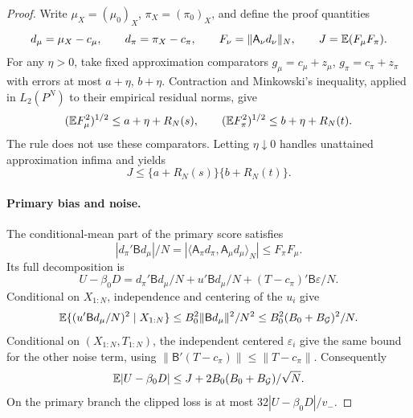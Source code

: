 \begin{proof}
Write $\mu_X=(\mu_0)_X$, $\pi_X=(\pi_0)_X$, and define the proof
quantities
\[
 d_\mu=\mu_X-c_\mu,\qquad d_\pi=\pi_X-c_\pi,\qquad
 F_\nu=\|\mathsf A_\nu d_\nu\|_N,\qquad J=\mathbb E(F_\mu F_\pi).
\]
For any $\eta>0$, take fixed approximation comparators
$g_\mu=c_\mu+z_\mu$, $g_\pi=c_\pi+z_\pi$ with errors at most
$a+\eta$, $b+\eta$. Contraction and Minkowski's inequality, applied in
$L_2(P^N)$ to their empirical residual norms, give
\[
 (\mathbb E F_\mu^2)^{1/2}\le a+\eta+R_N(s),
 \qquad
 (\mathbb E F_\pi^2)^{1/2}\le b+\eta+R_N(t).
\]
The rule does not use these comparators. Letting $\eta\downarrow0$
handles unattained approximation infima and yields
\begin{equation}
 J\le\{a+R_N(s)\}\{b+R_N(t)\}.
 \label{eq:adaptation-affine-moments-bound}
\end{equation}

\paragraph{Primary bias and noise.}
The conditional-mean part of the primary score satisfies
\begin{equation}
 |d_\pi'\mathsf B d_\mu|/N
 =|\langle\mathsf A_\pi d_\pi,\mathsf A_\mu d_\mu\rangle_N|
 \le F_\pi F_\mu.
 \label{eq:adaptation-bias}
\end{equation}
Its full decomposition is
\[
 U-\beta_0D=d_\pi'\mathsf B d_\mu/N
       +u'\mathsf B d_\mu/N
       +(T-c_\pi)'\mathsf B\varepsilon/N.
\]
Conditional on $X_{1:N}$, independence and centering of the $u_i$ give
\[
 \mathbb E\{(u'\mathsf B d_\mu/N)^2\mid X_{1:N}\}
 \le B_0^2\|\mathsf B d_\mu\|^2/N^2
 \le B_0^2(B_0+B_{\mathcal G})^2/N.
\]
Conditional on $(X_{1:N},T_{1:N})$, the independent centered
$\varepsilon_i$ give the same bound for the other noise term, using
$\|\mathsf B'(T-c_\pi)\|\le\|T-c_\pi\|$. Consequently
\begin{equation}
 \mathbb E|U-\beta_0D|
 \le J+2B_0(B_0+B_{\mathcal G})/\sqrt N.
 \label{eq:adaptation-score}
\end{equation}
On the primary branch the clipped loss is at most
$32|U-\beta_0D|/v_-$.


\end{proof}
